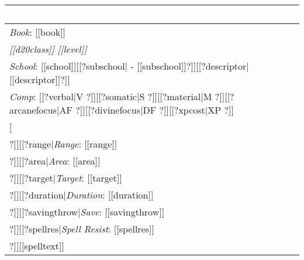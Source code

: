 \noindent
\begin{supertabular}{p{9cm}}
\vspace{1mm}\sf\Large\textbf{\textcolor{white}{[[name]]}} \\
\hline
\textit{Book}: [[book]] \\
\hline
\textit{[[d20class]] [[level]]}\\
\hline
\textit{School}: [[school]][[?subschool| - [[subschool]]?]][[?descriptor| [[descriptor]]?]]\\
\hline
\textit{Comp}: [[?verbal|V ?]][[?somatic|S ?]][[?material|M ?]][[?arcanefocus|AF ?]][[?divinefocus|DF ?]][[?xpcost|XP ?]]\\
\hline
[[?castingtime|\textit{Casting Time}: [[castingtime]] \\
\hline
?]][[?range|\textit{Range}: [[range]] \\
\hline
?]][[?area|\textit{Area}: [[area]] \\
\hline
?]][[?target|\textit{Target}: [[target]] \\
\hline
?]][[?duration|\textit{Duration}: [[duration]] \\
\hline
?]][[?savingthrow|\textit{Save}: [[savingthrow]] \\
\hline
?]][[?spellres|\textit{Spell Resist}: [[spellres]] \\
\hline
?]][[spelltext]]\\
\end{supertabular}


